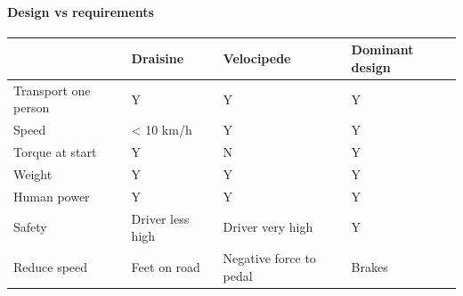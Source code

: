 \paragraph{Design vs requirements}
\begin{center}
\begin{tabularx}{\textwidth}{X|XXX}
 & Draisine & Velocipede & Dominant design \\ 
\hline 
Transport one person & Y & Y & Y \\ 
\hline 
Speed & < 10 km/h & Y & Y \\ 
\hline 
Torque at start & Y & N & Y \\ 
\hline 
Weight & Y & Y & Y \\ 
\hline 
Human power & Y & Y & Y \\ 
\hline 
Safety & Driver less high & Driver very high & Y \\ 
\hline 
Reduce speed & Feet on road & Negative force to pedal & Brakes \\ 
\end{tabularx}
\end{center}